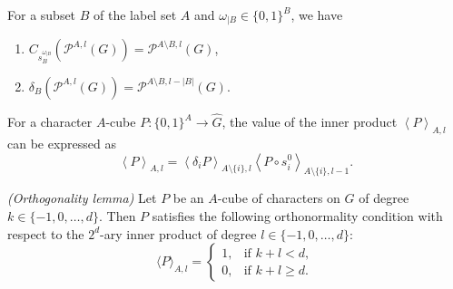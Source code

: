 \documentclass[10pt,a4paper]{amsart}
\begin{document}
\begin{proposition}
\label{prop:dBshift}
For a subset $B$ of the label set $A$ and $\omega_{|B} \in \{0,1\}^B$, we have 
\renewcommand{\labelenumi}{\roman{enumi})}
\begin{enumerate}
    
\item $ C_{s_{B}^{\omega_{|B}}} \left(\mathcal{P}^{A,l}(G)\right) = \mathcal{P}^{A\setminus B,l}(G)$,

\item $ \delta_B \left(\mathcal{P}^{A,l}(G)\right) = \mathcal{P}^{A\setminus B,l -|B|}(G)$.
\end{enumerate}
\end{proposition}

\begin{corollary}
\label{cor:split}
For a character $A$-cube  $P : \{0,1\}^A \to \widehat{G}$, the value of the inner product $\left\langle P \right\rangle_{A,l}$ can be expressed as
$$ \left\langle P \right\rangle_{A,l}  = 
\left\langle \delta_i P \right\rangle_{A\setminus \{i\},l} 
\left\langle P \circ s_i^0 \right\rangle_{A \setminus \{i\},l-1}.$$
\end{corollary}

\begin{lemma}
\label{lem:orth}
 {\it (Orthogonality lemma)}
Let $P$ be an  $A$-cube of characters on $G$ of degree $k\in \{-1, 0, \dots, d \}$. Then $P$  satisfies the following orthonormality condition with respect to the $2^d$-ary inner product of degree $l\in \{-1, 0, \dots, d \}$:
$$ \langle P \rangle_{A,l} = \begin{cases} 1, & \text{if } k + l < d, \\ 0, & \text{if } k + l \ge d. \end{cases}$$
\end{lemma}
\end{document}
